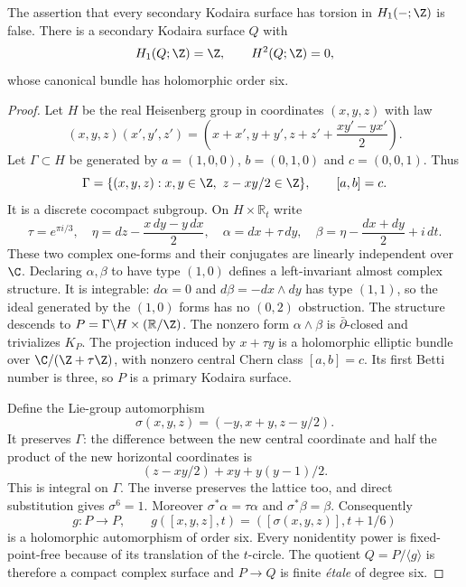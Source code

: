 
\begin{proposition}\label{cdp:st:C.3.2}

The assertion that every secondary Kodaira surface has torsion in
$H_1(-;\Z)$ is false. There is a secondary Kodaira surface $Q$ with
\[
H_1(Q;\Z)=\Z,\qquad H^2(Q;\Z)=0,
\]
whose canonical bundle has holomorphic order six.
\end{proposition}
\begin{proof}
Let $H$ be the real Heisenberg group in coordinates $(x,y,z)$ with law
\[
(x,y,z)(x',y',z')
=\left(x+x',y+y',z+z'+\frac{xy'-yx'}2\right).
\]
Let $\Gamma\subset H$ be generated by
$a=(1,0,0)$, $b=(0,1,0)$ and $c=(0,0,1)$. Thus
\[
\Gamma=\{(x,y,z):x,y\in\Z,\ z-xy/2\in\Z\},
\qquad [a,b]=c.
\]
It is a discrete cocompact subgroup. On $H\times\mathbb R_t$ write
\[
\tau=e^{\pi i/3},\quad
\eta=dz-\frac{x\,dy-y\,dx}{2},\quad
\alpha=dx+\tau\,dy,\quad
\beta=\eta-\frac{dx+dy}{2}+i\,dt.
\]
These two complex one-forms and their conjugates are linearly
independent over $\C$. Declaring $\alpha,\beta$ to have type $(1,0)$
defines a left-invariant almost complex structure. It is integrable:
$d\alpha=0$ and $d\beta=-dx\wedge dy$ has type $(1,1)$, so the
ideal generated by the $(1,0)$ forms has no $(0,2)$ obstruction.
The structure descends to
$P=\Gamma\backslash H\times(\mathbb R/\Z)$.
The nonzero form $\alpha\wedge\beta$ is $\bar\partial$-closed and
trivializes $K_P$. The projection induced by $x+\tau y$ is a
holomorphic elliptic bundle over $\C/(\Z+\tau\Z)$, with nonzero
central Chern class $[a,b]=c$. Its first Betti number is three, so
$P$ is a primary Kodaira surface.

Define the Lie-group automorphism
\[
\sigma(x,y,z)=(-y,x+y,z-y/2).
\]
It preserves $\Gamma$: the difference between the new central
coordinate and half the product of the new horizontal coordinates
is
\[
(z-xy/2)+xy+y(y-1)/2.
\]
This is integral on $\Gamma$. The inverse preserves the lattice too,
and direct substitution gives $\sigma^6=1$. Moreover
$\sigma^*\alpha=\tau\alpha$ and $\sigma^*\beta=\beta$.
Consequently
\[
g:P\longrightarrow P,\qquad
g([x,y,z],t)=([\sigma(x,y,z)],t+1/6)
\]
is a holomorphic automorphism of order six. Every nonidentity power
is fixed-point-free because of its translation of the $t$-circle.
The quotient $Q=P/\langle g\rangle$ is therefore a compact complex
surface and $P\to Q$ is finite \emph{\'etale} of degree six.


\end{proof}
